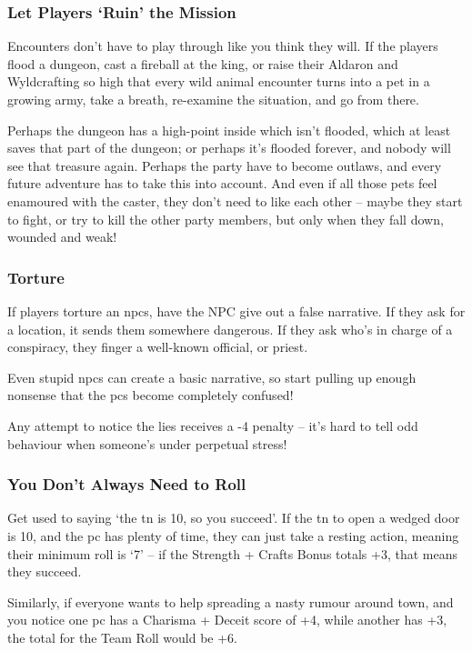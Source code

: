 \begin{multicols}{2}
\subsubsection{Let Players `Ruin' the Mission}

Encounters don't have to play through like you think they will.
If the players flood a dungeon, cast a fireball at the king, or raise their Aldaron and Wyldcrafting so high that every wild animal encounter turns into a pet in a growing army, take a breath, re-examine the situation, and go from there.

Perhaps the dungeon has a high-point inside which isn't flooded, which at least saves that part of the dungeon; or perhaps it's flooded forever, and nobody will see that treasure again.
Perhaps the party have to become outlaws, and every future adventure has to take this into account.
And even if all those pets feel enamoured with the caster, they don't need to like each other -- maybe they start to fight, or try to kill the other party members, but only when they fall down, wounded and weak!

\subsubsection{Torture}

If players torture an \glspl{npc}, have the NPC give out a false narrative.
If they ask for a location, it sends them somewhere dangerous.
If they ask who's in charge of a conspiracy, they finger a well-known official, or priest.

Even stupid \glspl{npc} can create a basic narrative, so start pulling up enough nonsense that the \glspl{pc} become completely confused!

Any attempt to notice the lies receives a -4 penalty -- it's hard to tell odd behaviour when someone's under perpetual stress!

\subsubsection{You Don't Always Need to Roll}

Get used to saying `the \gls{tn} is 10, so you succeed'.
If the \gls{tn} to open a wedged door is 10, and the \gls{pc} has plenty of time, they can just take a resting action, meaning their minimum roll is `7' -- if the Strength + Crafts Bonus totals +3, that means they succeed.

Similarly, if everyone wants to help spreading a nasty rumour around town, and you notice one \gls{pc} has a Charisma + Deceit score of +4, while another has +3, the total for the Team Roll would be +6.


\end{multicols}
